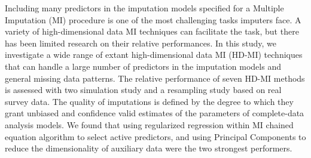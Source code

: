 
Including many predictors in the imputation models specified for a Multiple Imputation (MI) 
procedure is one of the most challenging tasks imputers face.
A variety of high-dimensional data MI techniques can facilitate the task, but there has been 
limited research on their relative performances.
In this study, we investigate a wide range of extant high-dimensional data MI (HD-MI) techniques 
that can handle a large number of predictors in the imputation models and general missing data 
patterns.
The relative performance of seven HD-MI methods is assessed with two simulation study and a 
resampling study based on real survey data.
The quality of imputations is defined by the degree to which they grant unbiased and confidence 
valid estimates of the parameters of complete-data analysis models.
We found that using regularized regression within MI chained equation algorithm to select active 
predictors, and using Principal Components to reduce the dimensionality of auxiliary data were 
the two strongest performers.

